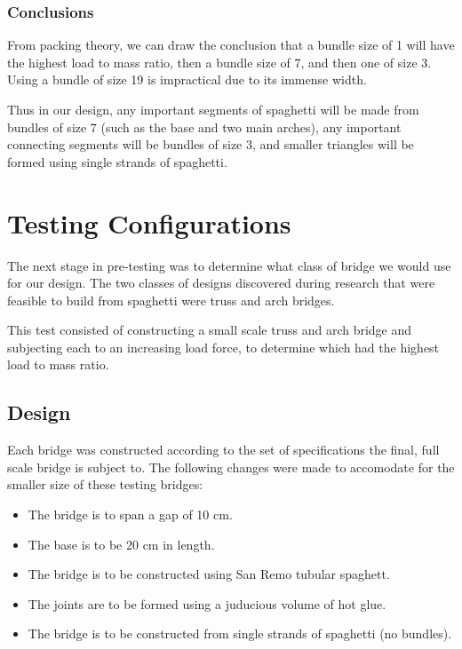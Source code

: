 \documentclass[a4paper,11pt]{article}
\begin{document}
\subsubsection{Conclusions}

From packing theory, we can draw the conclusion that a bundle size of 1 will
have the highest load to mass ratio, then a bundle size of 7, and then one of
size 3.
Using a bundle of size 19 is impractical due to its immense width.

Thus in our design, any important segments of spaghetti will be made from
bundles of size 7 (such as the base and two main arches), any important
connecting segments will be bundles of size 3, and smaller triangles will be
formed using single strands of spaghetti.




\section{Testing Configurations}

The next stage in pre-testing was to determine what class of bridge we would use
for our design.
The two classes of designs discovered during research that were feasible to
build from spaghetti were truss and arch bridges.

This test consisted of constructing a small scale truss and arch bridge and
subjecting each to an increasing load force, to determine which had the highest
load to mass ratio.


\subsection{Design}

Each bridge was constructed according to the set of specifications the final,
full scale bridge is subject to. The following changes were made to accomodate
for the smaller size of these testing bridges:

\begin{itemize}
\item The bridge is to span a gap of 10 cm.
\item The base is to be 20 cm in length.
\item The bridge is to be constructed using San Remo tubular spaghett.
\item The joints are to be formed using a juducious volume of hot glue.
\item The bridge is to be constructed from single strands of spaghetti (no
	bundles).
\end{itemize}
\end{document}

